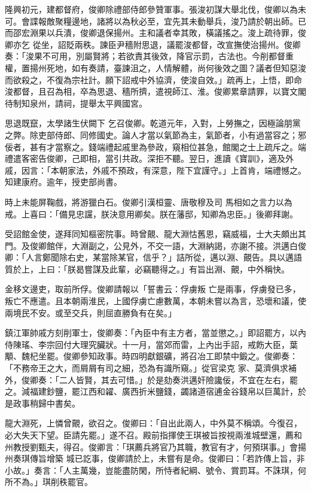 \begin{pinyinscope}
 隆興初元，建都督府，俊卿除禮部侍郎參贊軍事。張浚初謀大舉北伐，俊卿以為未可。會諜報敵聚糧邊地，諸將以為秋必至，宜先其未動舉兵，浚乃請於朝出師。已而邵宏淵果以兵潰，俊卿退保揚州。主和議者幸其敗，橫議搖之。浚上疏待罪，俊卿亦乞
 從坐，詔貶兩秩。諫臣尹穡附思退，議罷浚都督，改宣撫使治揚州。俊卿奏：「浚果不可用，別屬賢將；若欲責其後效，降官示罰，古法也。今削都督重權，置揚州死地，如有奏請，臺諫沮之，人情解體，尚何後效之圖？議者但知惡浚而欲殺之，不復為宗社計。願下詔戒中外協濟，使浚自效。」疏再上，上悟，即命浚都督，且召為相，卒為思退、穡所擠，遣視師江、淮。俊卿累章請罪，以寶文閣待制知泉州，請祠，提舉太平興國宮。



 思退既竄，太學諸生伏闕下
 乞召俊卿。乾道元年，入對，上勞撫之，因極論朋黨之弊。除吏部侍郎、同修國史。論人才當以氣節為主，氣節者，小有過當容之；邪佞者，甚有才當察之。錢端禮起戚里為參政，窺相位甚急，館閣之士上疏斥之。端禮遣客密告俊卿，己即相，當引共政。深拒不聽。翌日，進讀《寶訓》，適及外戚，因言：「本朝家法，外戚不預政，有深意，陛下宜謹守。」上首肯，端禮憾之。知建康府。逾年，授吏部尚書。



 時上未能屏鞠戲，將游獵白石。俊卿引漢桓靈、唐敬穆及司
 馬相如之言力以為戒。上喜曰：「備見忠讜，朕決意用卿矣。朕在藩邸，知卿為忠臣。」後卿拜謝。



 受詔館金使，遂拜同知樞密院事。時曾覿、龍大淵怙舊恩，竊威福，士大夫頗出其門。及俊卿館伴，大淵副之，公見外，不交一語，大淵納謁，亦謝不接。洪邁白俊卿：「人言鄭聞除右史，某當除某官，信乎？」詰所從，邁以淵、覿告。具以邁語質於上，上曰：「朕曷嘗謀及此輩，必竊聽得之。」有旨出淵、覿，中外稱快。



 金移文邊吏，取前所俘。俊卿請報以「誓書云：俘虜叛
 亡是兩事，俘虜發已多，叛亡不應遣。且本朝兩淮民，上國俘虜亡慮數萬，本朝未嘗以為言，恐壞和議，使兩境民不安。或至交兵，則屈直勝負有在矣。」



 鎮江軍帥戚方刻削軍士，俊卿奏：「內臣中有主方者，當並懲之。」即詔罷方，以內侍陳瑤、李宗回付大理究臟狀。十一月，當郊而雷，上內出手詔，戒飭大臣，葉顒、魏杞坐罷。俊卿參知政事。時四明獻銀礦，將召冶工即禁中鍛之。俊卿奏：「不務帝王之大，而屑屑有司之細，恐為有識所窺。」從官梁克
 家、莫濟俱求補外，俊卿奏：「二人皆賢，其去可惜。」於是劾奏洪邁奸險讒佞，不宜在左右，罷之。減福建鈔鹽，罷江西和糴、廣西折米鹽錢，蠲諸道宿逋金谷錢帛以巨萬計，於是政事稍歸中書矣。



 龍大淵死，上憐曾覿，欲召之。俊卿曰：「自出此兩人，中外莫不稱頌。今復召，必大失天下望。臣請先罷。」遂不召。殿前指揮使王琪被旨按視兩淮城壁還，薦和州教授劉甄夫，得召。俊卿言：「琪薦兵將官乃其職，教官有才，何預琪事。」會揚州奏琪傳旨增築
 城已訖事，俊卿請於上，未嘗有是命。俊卿曰：「若詐傳上旨，非小故。」奏言：「人主萬幾，豈能盡防閑，所恃者紀綱、號令、賞罰耳。不誅琪，何所不為。」琪削秩罷官。




\end{pinyinscope}
